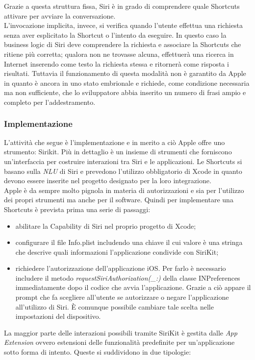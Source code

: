 		Grazie a questa struttura fissa, Siri è in grado di comprendere quale Shortcuts attivare per avviare la conversazione. \\
		L'invocazione implicita, invece, si verifica quando l'utente effettua una richiesta senza aver esplicitato la Shortcut o l'intento da eseguire. In questo caso la business logic di Siri deve comprendere la richiesta e associare la Shortcuts che ritiene più corretta; qualora non ne trovasse alcuna, effettuerà una ricerca in Internet inserendo come testo la richiesta stessa e ritornerà come risposta i risultati. Tuttavia il funzionamento di questa modalità non è garantito da Apple in quanto è ancora in uno stato embrionale e richiede, come condizione necessaria ma non sufficiente, che lo sviluppatore abbia inserito un numero di frasi ampio e completo per l'addestramento.
		\subsubsection{Implementazione}
		L'attività che segue è l'implementazione e in merito a ciò Apple offre uno strumento: Sirikit. Più in dettaglio è un insieme di strumenti che forniscono un'interfaccia per costruire interazioni tra Siri e le applicazioni. Le Shortcuts si basano sulla \textit{NLU} di Siri e prevedono l'utilizzo obbligatorio di Xcode in quanto devono essere inserite nel progetto designato per la loro integrazione. \\
		Apple è da sempre molto pignola in materia di autorizzazioni e sia per  l'utilizzo dei propri strumenti ma anche per il software. Quindi per implementare una Shortcuts è prevista prima una serie di passaggi:
		\begin{itemize}
			\item abilitare la Capability di Siri nel proprio progetto di Xcode;
			\item configurare il file Info.plist includendo una chiave il cui valore è una stringa che descrive quali informazioni l'applicazione condivide con SiriKit;
			\item richiedere l’autorizzazione dell’applicazione iOS. Per farlo è necessario includere il metodo \textit{requestSiriAuthorization(\_:)} della classe INPreferences immediatamente dopo il codice che avvia l’applicazione. Grazie a ciò appare il prompt che fa scegliere all’utente se autorizzare o negare l’applicazione all’utilizzo di Siri. È comunque possibile cambiare tale scelta nelle impostazioni del dispositivo.
		\end{itemize}
		La maggior parte delle interazioni possibili tramite SiriKit è gestita dalle \textit{App Extension} ovvero estensioni delle funzionalità predefinite per un'applicazione sotto forma di intento. Queste si suddividono in due tipologie:
